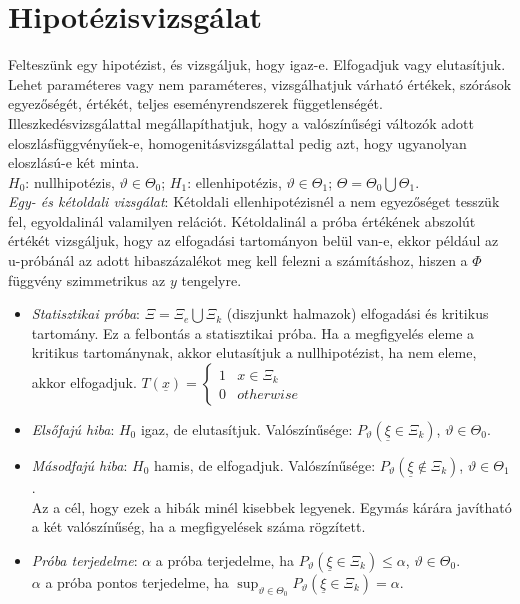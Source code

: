 \documentclass[margin=0px]{article}
\begin{document}
\section{Hipotézisvizsgálat}

Felteszünk egy hipotézist, és vizsgáljuk, hogy igaz-e. Elfogadjuk vagy elutasítjuk. Lehet paraméteres vagy nem paraméteres, vizsgálhatjuk várható értékek, szórások egyezőségét, értékét, teljes eseményrendszerek függetlenségét. Illeszkedésvizsgálattal megállapíthatjuk, hogy a valószínűségi változók adott eloszlásfüggvényűek-e, homogenitásvizsgálattal pedig azt, hogy ugyanolyan eloszlású-e két minta. \\
$H_0$: nullhipotézis, $\vartheta \in \Theta_0$; $H_1$: ellenhipotézis, $\vartheta \in \Theta_1$; $\Theta = \Theta_0 \bigcup \Theta_1$. \\
\textit{Egy- és kétoldali vizsgálat}: Kétoldali ellenhipotézisnél a nem egyezőséget tesszük fel, egyoldalinál valamilyen relációt. Kétoldalinál a próba értékének abszolút értékét vizsgáljuk, hogy az elfogadási tartományon belül van-e, ekkor például az u-próbánál az adott hibaszázalékot meg kell felezni a számításhoz, hiszen a $\Phi$ függvény szimmetrikus az $y$ tengelyre.
\begin{itemize}
    \item \textit{Statisztikai próba}: $\Xi = \Xi_e \bigcup \Xi_k$ (diszjunkt halmazok) elfogadási és kritikus tartomány. Ez a felbontás a statisztikai próba. Ha a megfigyelés eleme a kritikus tartománynak, akkor elutasítjuk a nullhipotézist, ha nem eleme, akkor elfogadjuk. $T(\underline{x}) = \left\{\begin{array} {lr} 1 & x \in \Xi_k \\ 0 & otherwise \end{array}\right.$
    \item \textit{Elsőfajú hiba}: $H_0$ igaz, de elutasítjuk. Valószínűsége: $P_{\vartheta}(\underline{\xi} \in \Xi_k)$, $\vartheta \in \Theta_0$.
    \item \textit{Másodfajú hiba}: $H_0$ hamis, de elfogadjuk. Valószínűsége: $P_{\vartheta}(\underline{\xi} \notin \Xi_k)$, $\vartheta \in \Theta_1$. \\
          Az a cél, hogy ezek a hibák minél kisebbek legyenek. Egymás kárára javítható a két valószínűség, ha a megfigyelések száma rögzített.
    \item \textit{Próba terjedelme}: $\alpha$ a próba terjedelme, ha $P_{\vartheta}(\underline{\xi} \in \Xi_k) \leq \alpha$, $\vartheta \in \Theta_0$. \\
          $\alpha$ a próba pontos terjedelme, ha $\sup_{\vartheta \in \Theta_0}{P_{\vartheta}(\underline{\xi} \in \Xi_k) = \alpha}$.
\end{itemize}
\end{document}
